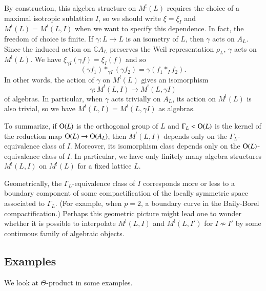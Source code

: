 \documentclass[12pt]{amsart}
\numberwithin{equation}{section}
\theoremstyle{definition}
\theoremstyle{remark}
\newcommand{\C}{\mathbb{C}}
\newcommand{\ML}{M^{!}(L)}
\begin{document}
By construction, this algebra structure on ${\ML}$ requires the choice of 
a maximal isotropic sublattice $I$, 
so we should write $\xi=\xi_{I}$ and ${\ML}=M^{!}(L, I)$ when we want to specify this dependence. 
In fact, the freedom of choice is finite. 
If $\gamma\colon L\to L$ is an isometry of $L$, 
then $\gamma$ acts on $A_{L}$. 
Since the induced action on ${\C}A_{L}$ preserves the Weil representation $\rho_L$, 
$\gamma$ acts on ${\ML}$. 
We have 
$\xi_{\gamma I}(\gamma f)=\xi_{I}(f)$ 
and so 
\begin{equation*}
(\gamma f_{1})\ast_{\gamma I} (\gamma f_{2}) 
= \gamma (f_{1}\ast_{I} f_{2}). 
\end{equation*}
In other words, the action of $\gamma$ on ${\ML}$ gives an isomorphism 
\begin{equation*}
\gamma : M^!(L, I) \to M^!(L, \gamma I) 
\end{equation*}
of algebras. 
In particular, 
when $\gamma$ acts trivially on $A_{L}$, 
its action on ${\ML}$ is also trivial, 
so we have 
$M^{!}(L, I)=M^{!}(L, \gamma I)$ 
as algebras. 

To summarize, 
if ${\rm O}(L)$ is the orthogonal group of $L$ and 
$\Gamma_{L}<{\rm O}(L)$ is the kernel of the reduction map ${\rm O}(L)\to {\rm O}(A_{L})$, 
then $M^!(L, I)$ depends only on the $\Gamma_{L}$-equivalence class of $I$. 
Moreover, its isomorphism class depends only on the ${\rm O}(L)$-equivalence class of $I$. 
In particular, we have only finitely many algebra structures $M^!(L, I)$ on ${\ML}$ 
for a fixed lattice $L$. 

Geometrically, the $\Gamma_{L}$-equivalence class of $I$ corresponds more or less to 
a boundary component of some compactification of the locally symmetric space associated to $\Gamma_{L}$. 
(For example, when $p=2$, a boundary curve in the Baily-Borel compactification.) 
Perhaps this geometric picture might lead one to wonder whether it is possible to interpolate 
$M^!(L, I)$ and $M^!(L, I')$ for $I\not\sim I'$ 
by some continuous family of algebraic objects. 


\subsection{Examples}\label{ssec: example}

We look at $\Theta$-product in some examples. 
\end{document}
